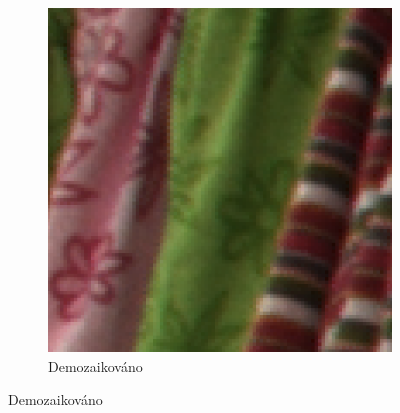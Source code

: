 \documentclass{beamer}
\begin{document}
\begin{frame}[t,fragile]
\begin{figure}[htbp]
\begin{subfigure}[b]{0.32\textwidth}
        \end{subfigure}
        \begin{subfigure}[b]{0.32\textwidth}
                \includegraphics[width=\textwidth]{e_demosaiced.png}
                \caption{\scriptsize{Demozaikováno}}

        \end{subfigure}
        \end{figure}
    

				
				
	\end{frame}	
	
	
\end{document}

